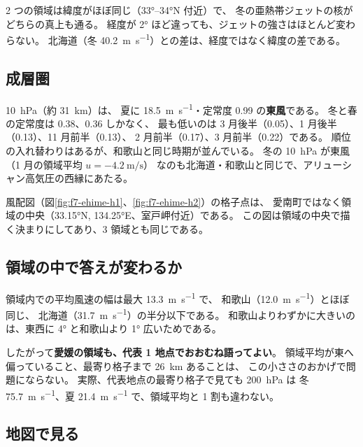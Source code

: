 2 つの領域は緯度がほぼ同じ（\ang{33}--\ang{34}N 付近）で、
冬の亜熱帯ジェットの核がどちらの真上も通る。
経度が \ang{2} ほど違っても、ジェットの強さはほとんど変わらない。
北海道（冬 \SI{40.2}{\metre\per\second}）との差は、経度ではなく緯度の差である。

\subsection{成層圏}




\SI{10}{\hecto\pascal}（約 \SI{31}{\kilo\metre}）は、
夏に \SI{18.5}{\metre\per\second}・定常度 0.99 の\textbf{東風}である。
冬と春の定常度は 0.38、0.36 しかなく、
最も低いのは 3 月後半（0.05）、1 月後半（0.13）、11 月前半（0.13）、
2 月前半（0.17）、3 月前半（0.22）である。
順位の入れ替わりはあるが、和歌山と同じ時期が並んでいる。
冬の \SI{10}{\hecto\pascal} が東風（1 月の領域平均 $u = \SI{-4.2}{\metre\per\second}$）
なのも北海道・和歌山と同じで、アリューシャン高気圧の西縁にあたる。

風配図（図\ref{fig:f7-ehime-h1}、\ref{fig:f7-ehime-h2}）の格子点は、
愛南町ではなく領域の中央（\ang{33.15}N, \ang{134.25}E、室戸岬付近）である。
この図は領域の中央で描く決まりにしてあり、3 領域とも同じである。

\subsection{領域の中で答えが変わるか}



領域内での平均風速の幅は最大 \SI{13.3}{\metre\per\second} で、
和歌山（\SI{12.0}{\metre\per\second}）とほぼ同じ、
北海道（\SI{31.7}{\metre\per\second}）の半分以下である。
和歌山よりわずかに大きいのは、東西に \ang{4} と和歌山より \ang{1} 広いためである。

したがって\textbf{愛媛の領域も、代表 1 地点でおおむね語ってよい}。
領域平均が東へ偏っていること、最寄り格子まで \SI{26}{\kilo\metre} あることは、
この小ささのおかげで問題にならない。
実際、代表地点の最寄り格子で見ても \SI{200}{\hecto\pascal} は
冬 \SI{75.7}{\metre\per\second}、夏 \SI{21.4}{\metre\per\second} で、領域平均と 1 割も違わない。

\subsection{地図で見る}



